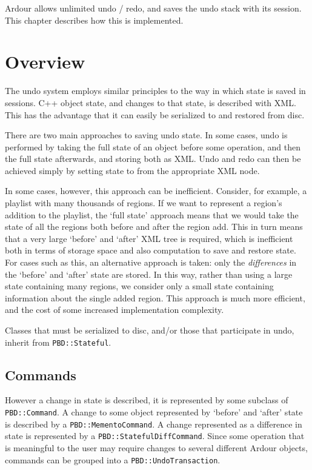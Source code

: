 \documentclass[10pt,a4paper]{book}
\newcommand{\code}[1]{\texttt{#1}}
\begin{document}
Ardour allows unlimited undo / redo, and saves the undo stack with its
session.  This chapter describes how this is implemented.

\section{Overview}

The undo system employs similar principles to the way in which state
is saved in sessions.  C++ object state, and changes to that state, is
described with XML\@.  This has the advantage that it can easily be
serialized to and restored from disc.

There are two main approaches to saving undo state.  In some cases,
undo is performed by taking the full state of an object before some
operation, and then the full state afterwards, and storing both as
XML\@.  Undo and redo can then be achieved simply by setting state to
from the appropriate XML node.

In some cases, however, this approach can be inefficient.  Consider,
for example, a playlist with many thousands of regions.  If we want to
represent a region's addition to the playlist, the `full state'
approach means that we would take the state of all the regions both
before and after the region add.  This in turn means that a very large
`before' and `after' XML tree is required, which is inefficient both
in terms of storage space and also computation to save and restore
state.  For cases such as this, an alternative approach is taken: only
the \emph{differences} in the `before' and `after' state are stored.
In this way, rather than using a large state containing many regions,
we consider only a small state containing information about the single
added region.  This approach is much more efficient, and the cost of
some increased implementation complexity.

Classes that must be serialized to disc, and/or those that participate
in undo, inherit from \code{PBD::Stateful}.

\subsection{Commands}

However a change in state is described, it is represented by some
subclass of \code{PBD::Command}.  A change to some object represented
by `before' and `after' state is described by a
\code{PBD::MementoCommand}.  A change represented as a difference in
state is represented by a \code{PBD::StatefulDiffCommand}.  Since some
operation that is meaningful to the user may require changes to
several different Ardour objects, commands can be grouped into a
\code{PBD::UndoTransaction}.
\end{document}

